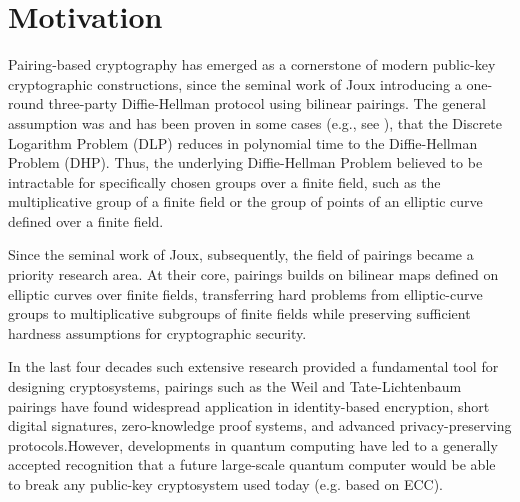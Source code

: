 \section{Motivation}
\label{sec:ch00.motivation}

Pairing-based cryptography has emerged as a cornerstone of modern public-key cryptographic constructions, 
since the seminal work of Joux\cite{joux2004one} introducing a one-round three-party Diffie-Hellman protocol using bilinear pairings. \cite{Menezes2009Pairing}
The general assumption was and has been proven in some cases (e.g., see \cite{denBoer1988diffie, maurer1999relationship}), that the Discrete Logarithm Problem (DLP) reduces in polynomial time to the Diffie-Hellman Problem (DHP).\cite{Menezes2009Pairing}
Thus, the underlying Diffie-Hellman Problem believed to be intractable for specifically chosen groups over a finite field, such as the multiplicative group of a finite field or the group of points of an elliptic curve defined over a finite field. \cite{Menezes2009Pairing}



Since the seminal work of Joux\cite{joux2004one}, subsequently, the field of pairings became a priority research area. 	
At their core, pairings builds on bilinear maps defined on elliptic curves over finite fields, transferring hard problems from elliptic-curve groups to multiplicative subgroups of finite fields while preserving sufficient hardness assumptions for cryptographic security.

In the last four decades such extensive research provided a fundamental tool for designing cryptosystems, 
pairings such as the Weil and Tate-Lichtenbaum pairings have found widespread application in identity-based encryption\cite{BF01}, short digital signatures, zero-knowledge proof systems\cite{bitansky2012extractable}, and advanced privacy-preserving protocols.However, developments in quantum computing have led to a generally accepted recognition that a future large-scale quantum computer would be able to break any public-key cryptosystem used today (e.g. based on ECC).\cite{AranhaFotiadisGuillevic2024}


